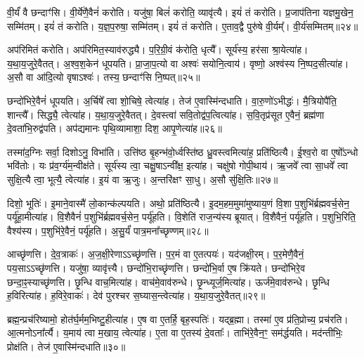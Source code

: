 वी॒र्यं॑ वै छन्दाꣳ॑सि। 
वी॒र्ये॑णै॒वैनं॑ करोति। 
यजु॑षा॒ बिलं॑ करोति॒ व्यावृ॑त्यै। 
इयं॑ तं करोति। 
प्र॒जाप॑तिना यज्ञमु॒खेन॒ सम्मि॑तम्। 
इयं॑ तं करोति। 
य॒ज्ञ॒प॒रुषा॒ सम्मि॑तम्। 
इयं॑ तं करोति। 
ए॒ताव॒द्वै पुरु॑षे वी॒र्यम्᳚। 
वी॒र्य॑सम्मितम्॥२४॥

अप॑रिमितं करोति। 
अप॑रिमित॒स्याव॑रुद्ध्यै। 
प॒रि॒ग्री॒वं क॑रोति॒ धृत्यै᳚। 
सूर्य॑स्य॒ हर॑सा श्रा॒येत्या॑ह। 
य॒था॒य॒जुरे॒वैतत्। 
अ॒श्व॒श॒केन॑ धूपयति। 
प्रा॒जा॒प॒त्यो वा अश्वः॑ सयोनि॒त्वाय॑। 
वृष्णो॒ अश्व॑स्य नि॒ष्पद॒सीत्या॑ह। 
अ॒सौ वा आ॑दि॒त्यो वृषाऽश्वः॑। 
तस्य॒ छन्दाꣳ॑सि नि॒ष्पत्॥२५॥

छन्दो॑भिरे॒वैनं॑ धूपयति। 
अ॒र्चिषे᳚ त्वा शो॒चिषे॒ त्वेत्या॑ह। 
तेज॑ ए॒वास्मि॑न्दधाति। 
वा॒रु॒णो॑ऽभीद्धः॑। 
मै॒त्रियोपै॑ति॒ शान्त्यै᳚। 
सिद्ध्यै॒ त्वेत्या॑ह। 
य॒था॒य॒जुरे॒वैतत्। 
दे॒वस्त्वा॑ सवि॒तोद्व॑प॒त्वित्या॑ह। 
स॒वि॒तृप्र॑सूत ए॒वैनं॒ ब्रह्म॑णा दे॒वता॑भि॒रुद्व॑पति। 
अप॑द्यमानः पृथि॒व्यामाशा॒ दिश॒ आपृ॒णेत्या॑ह॥२६॥

तस्मा॑द॒ग्निः सर्वा॒ दिशोऽनु॒ विभा॑ति। 
उत्ति॑ष्ठ बृ॒हन्भ॑वो॒र्ध्वस्ति॑ष्ठ ध्रु॒वस्त्वमित्या॑ह॒ प्रति॑ष्ठित्यै। 
ई॒श्व॒रो वा ए॒षो᳚ऽन्धो भवि॑तोः। 
यः प्र॑व॒र्ग्य॑म॒न्वीक्ष॑ते। 
सूर्य॑स्य त्वा॒ चक्षु॒षाऽन्वी᳚क्ष॒ इत्या॑ह। 
चक्षु॑षो गोपी॒थाय॑। 
ऋ॒जवे᳚ त्वा सा॒धवे᳚ त्वा सुक्षि॒त्यै त्वा॒ भूत्यै॒ त्वेत्या॑ह। 
इ॒यं वा ऋ॒जुः। 
अ॒न्तरि॑क्षꣳ सा॒धु। 
अ॒सौ सु॑क्षि॒तिः॥२७॥

दिशो॒ भूतिः॑। 
इ॒माने॒वास्मै॑ लो॒कान्क॑ल्पयति। 
अथो॒ प्रति॑ष्ठित्यै। 
इ॒दम॒हम॒मुमा॑मुष्याय॒णं  वि॒शा प॒शुभि॑र्ब्रह्मवर्च॒सेन॒ पर्यू॑हा॒मीत्या॑ह। 
वि॒शैवैनं॑ प॒शुभि॑र्ब्रह्मवर्च॒सेन॒ पर्यू॑हति। 
वि॒शेति॑ राज॒न्य॑स्य ब्रूयात्। 
वि॒शैवैनं॒ पर्यू॑हति। 
प॒शुभि॒रिति॒ वैश्य॑स्य। 
प॒शुभि॑रे॒वैनं॒ पर्यू॑हति। 
अ॒सु॒र्यं॑ पात्र॒मना᳚च्छृण्णम्॥२८॥

आच्छृ॑णत्ति। 
दे॒व॒त्राकः॑। 
अ॒ज॒क्षी॒रेणाऽऽच्छृ॑णत्ति। 
प॒र॒मं वा ए॒तत्पयः॑। 
यद॑जक्षी॒रम्। 
प॒र॒मेणै॒वैनं॒ पय॒साऽऽच्छृ॑णत्ति। 
यजु॑षा॒ व्यावृ॑त्त्यै। 
छन्दो॑भि॒राच्छृ॑णत्ति। 
छन्दो॑भि॒र्वा ए॒ष क्रि॑यते। 
छन्दो॑भिरे॒व छन्दा॒ꣴ॒स्याच्छृ॑णत्ति। 
छृ॒न्धि वाच॒मित्या॑ह। 
वाच॑मे॒वाव॑रुन्धे। 
छृ॒न्ध्यूर्ज॒मित्या॑ह। 
ऊर्ज॑मे॒वाव॑रुन्धे। 
छृ॒न्धि ह॒विरित्या॑ह। 
ह॒विरे॒वाकः॑। 
देव॑ पुरश्चर स॒घ्यास॒न्त्वेत्या॑ह। 
य॒था॒य॒जुरे॒वैतत्॥२९॥
\anuvakamend[स्या॒द्यत् प्र॑व॒र्ग्य॑श्छन्दो॑भिः करोति वी॒र्य॑सम्मितं॒ छन्दाꣳ॑सि नि॒ष्पत्पृ॒णेत्या॑ह सुक्षि॒तिरना᳚च्छृण्ण॒ञ्छन्दा॒ꣴ॒स्या\-च्छृ॑णत्त्य॒ष्टौ च॑]

ब्रह्म॒न्प्रच॑रिष्यामो॒ होत॑र्घ॒र्मम॒भिष्टु॒हीत्या॑ह। 
ए॒ष वा ए॒तर्\mbox{}हि॒ बृह॒स्पतिः॑। 
यद्ब्र॒ह्मा। 
तस्मा॑ ए॒व प्र॑ति॒प्रोच्य॒ प्रच॑रति। 
आ॒त्मनोऽना᳚र्त्यै। 
य॒माय॑ त्वा म॒खाय॒ त्वेत्या॑ह। 
ए॒ता वा ए॒तस्य॑ दे॒वताः᳚। 
ताभि॑रे॒वैन॒ꣳ॒ सम॑र्द्धयति। 
मद॑न्तीभिः॒ प्रोक्ष॑ति। 
तेज॑ ए॒वास्मि॑न्दधाति॥३०॥

